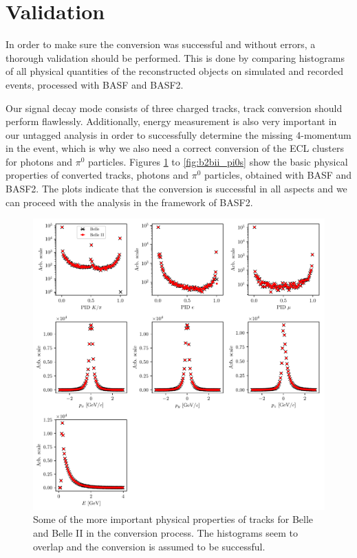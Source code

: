 \section{Validation}

In order to make sure the conversion was successful and without errors, a thorough validation should be performed. This is done by comparing histograms of all physical quantities of the reconstructed objects on simulated and recorded events, processed with BASF and BASF2. 

Our signal decay mode consists of three charged tracks, track conversion should perform flawlessly. Additionally, energy measurement is also very important in our untagged analysis in order to successfully determine the missing 4-momentum in the event, which is why we also need a correct conversion of the ECL clusters for photons and $\pi^0$ particles. Figures \ref{fig:b2bii_tracks} to \ref{fig:b2bii_pi0s} show the basic physical properties of converted tracks, photons and $\pi^0$ particles, obtained with BASF and BASF2. The plots indicate that the conversion is successful in all aspects and we can proceed with the analysis in the framework of BASF2.

\begin{figure}[H]
	\centering
	\captionsetup{width=0.8\linewidth}
	\includegraphics[width=\linewidth]{fig/b2bii_tracks}
	\caption{Some of the more important physical properties of tracks for Belle and Belle II in the conversion process. The histograms seem to overlap and the conversion is assumed to be successful.}
	\label{fig:b2bii_tracks}
\end{figure}

